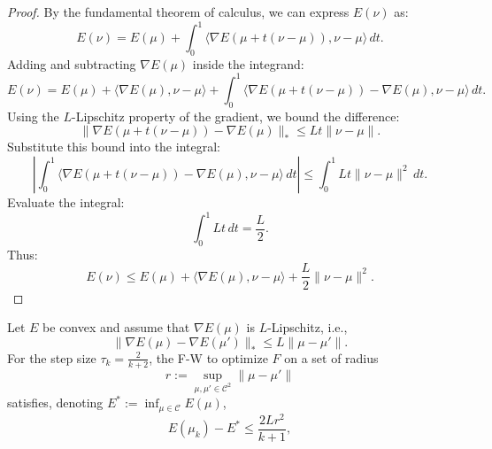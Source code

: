 \begin{proof}
By the fundamental theorem of calculus, we can express $E(\nu)$ as:
\[
E(\nu) = E(\mu) + \int_0^1 \langle \nabla E(\mu + t (\nu - \mu)), \nu - \mu \rangle \, dt.
\]
Adding and subtracting $\nabla E(\mu)$ inside the integrand:
\[
E(\nu) = E(\mu) + \langle \nabla E(\mu), \nu - \mu \rangle + \int_0^1 \langle \nabla E(\mu + t (\nu - \mu)) - \nabla E(\mu), \nu - \mu \rangle \, dt.
\]
Using the $L$-Lipschitz property of the gradient, we bound the difference:
\[
\|\nabla E(\mu + t (\nu - \mu)) - \nabla E(\mu)\|_* \leq L t \|\nu - \mu\|.
\]
Substitute this bound into the integral:
\[
\left| \int_0^1 \langle \nabla E(\mu + t (\nu - \mu)) - \nabla E(\mu), \nu - \mu \rangle \, dt \right| \leq \int_0^1 L t \|\nu - \mu\|^2 \, dt.
\]
Evaluate the integral:
\[
\int_0^1 L t \, dt = \frac{L}{2}.
\]
Thus:
\[
E(\nu) \leq E(\mu) + \langle \nabla E(\mu), \nu - \mu \rangle + \frac{L}{2} \|\nu - \mu\|^2.
\]
\end{proof}



\begin{thm}
Let \(E\) be convex and assume that \(\nabla E(\mu)\) is \(L\)-Lipschitz, i.e.,
\[
	\|\nabla E(\mu) - \nabla E(\mu')\|_* \leq L \|\mu - \mu'\|.
\]
For the step size \(\tau_k = \frac{2}{k+2}\), the F-W to optimize $F$ on a set of radius 
$$
	r := \sup_{\mu,\mu' \in \mathcal{C}^2} \|\mu-\mu'\|
$$ 
satisfies, denoting $E^* := \inf_{\mu \in \mathcal{C}} E(\mu)$, 
\[
	E(\mu_k) - E^*\leq \frac{2 L r^2}{k+1},
\]
\end{thm}

